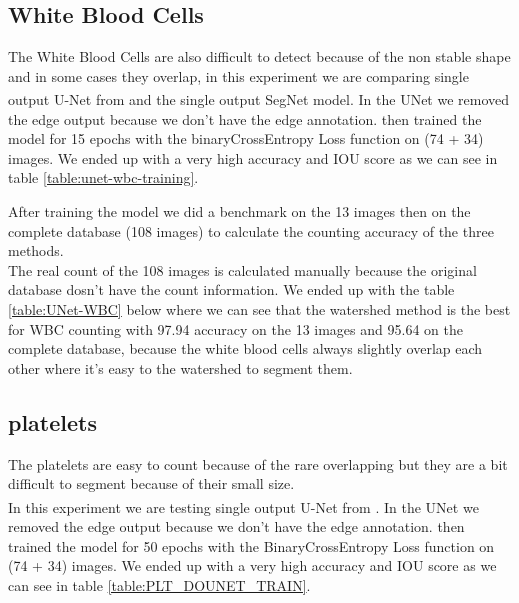 \subsection{White Blood Cells}
\hspace{\parindent}
The White Blood Cells are also difficult to detect because of the non stable shape and in some cases they overlap, in this experiment we are comparing single output U-Net from \textsuperscript{\cite{10.1007/978-3-030-44584-3_31}} and the single output SegNet model.
In the UNet we removed the edge output because we don't have the edge annotation. then trained the model for 15 epochs with the binaryCrossEntropy Loss function on (74 + 34) images. 
We ended up with a very high accuracy and IOU score as we can see in table \ref{table:unet-wbc-training}.



After training the model we did a benchmark on the 13 images then on the complete database (108 images) to calculate the counting accuracy of the three methods.\\ 
The real count of the 108 images is calculated manually because the original database dosn't have the count information. We ended up with the table \ref{table:UNet-WBC} below where we can see that the watershed method is the best for WBC counting with 97.94 accuracy on the 13 images and 95.64 on the complete database, because the white blood cells always slightly overlap each other where it's easy to the watershed to segment them.



\subsection{platelets}
\hspace{\parindent}
The platelets are easy to count because of the rare overlapping but they are a bit difficult to segment because of their small size.\\
In this experiment we are testing single output U-Net from \textsuperscript{\cite{10.1007/978-3-030-44584-3_31}}. In the UNet we removed the edge output because we don’t have the edge annotation.
then trained the model for 50 epochs with the BinaryCrossEntropy Loss function on (74 + 34) images.
We ended up with a very high accuracy and IOU score as we can see in table \ref{table:PLT_DOUNET_TRAIN}.



